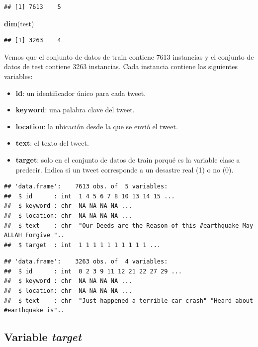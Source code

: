 \documentclass[
]{article}
\newenvironment{Shaded}{\begin{snugshade}}{\end{snugshade}}
\newcommand{\KeywordTok}[1]{\textcolor[rgb]{0.13,0.29,0.53}{\textbf{#1}}}
\newcommand{\NormalTok}[1]{#1}
\providecommand{\tightlist}{%
  \setlength{\itemsep}{0pt}\setlength{\parskip}{0pt}}
\begin{document}
\begin{verbatim}
## [1] 7613    5
\end{verbatim}

\begin{Shaded}
\begin{Highlighting}[]
\KeywordTok{dim}\NormalTok{(test)}
\end{Highlighting}
\end{Shaded}

\begin{verbatim}
## [1] 3263    4
\end{verbatim}

Vemos que el conjunto de datos de train contiene 7613 instancias y el
conjunto de datos de test contiene 3263 instancias. Cada instancia
contiene las siguientes variables:

\begin{itemize}
\tightlist
\item
  \textbf{id}: un identificador único para cada tweet.
\item
  \textbf{keyword}: una palabra clave del tweet.
\item
  \textbf{location}: la ubicación desde la que se envió el tweet.
\item
  \textbf{text}: el texto del tweet.
\item
  \textbf{target}: solo en el conjunto de datos de train porqué es la
  variable clase a predecir. Indica si un tweet corresponde a un
  desastre real (1) o no (0).
\end{itemize}

\begin{verbatim}
## 'data.frame':    7613 obs. of  5 variables:
##  $ id      : int  1 4 5 6 7 8 10 13 14 15 ...
##  $ keyword : chr  NA NA NA NA ...
##  $ location: chr  NA NA NA NA ...
##  $ text    : chr  "Our Deeds are the Reason of this #earthquake May ALLAH Forgive "..
##  $ target  : int  1 1 1 1 1 1 1 1 1 1 ...
\end{verbatim}

\begin{verbatim}
## 'data.frame':    3263 obs. of  4 variables:
##  $ id      : int  0 2 3 9 11 12 21 22 27 29 ...
##  $ keyword : chr  NA NA NA NA ...
##  $ location: chr  NA NA NA NA ...
##  $ text    : chr  "Just happened a terrible car crash" "Heard about #earthquake is"..
\end{verbatim}

\hypertarget{variable-target}{%
\subsection{\texorpdfstring{Variable
\emph{target}}{Variable target}}\label{variable-target}}
\end{document}
